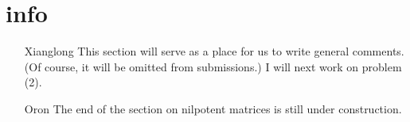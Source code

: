 \section*{info}
\begin{itemize}
	\item[Xianglong] This section will serve as a place for us to write general comments. (Of course, it will be omitted from submissions.) I will next work on problem (2).

    \item[Oron] The end of the section on nilpotent matrices is still under construction.
\end{itemize}
\newpage
